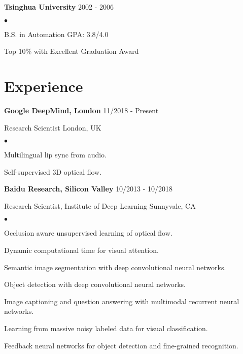 \documentclass[margin]{res3}
\newenvironment{list1}{
  \begin{list}{\ding{113}}{%
      \setlength{\itemsep}{0.03in}
      \setlength{\parsep}{0in} \setlength{\parskip}{0in}
      \setlength{\topsep}{0in} \setlength{\partopsep}{0in}
      \setlength{\leftmargin}{0in}}}{\end{list}}
\newenvironment{list2}{
  \begin{list}{$\bullet$}{%
      \setlength{\itemsep}{0.02in}
      \setlength{\parsep}{0in} \setlength{\parskip}{0in}
      \setlength{\topsep}{0in} \setlength{\partopsep}{0in}
      \setlength{\leftmargin}{0.2in}}}{\end{list}}
\begin{document}
\begin{resume}
{\bf Tsinghua University} \hfill {2002 - 2006}
\begin{list2}
\item B.S. in Automation \hfill {GPA: 3.8/4.0}
\vspace{-2pt}
\item Top 10\% with Excellent Graduation Award 
\end{list2}


\section{\sc Experience}

\begin{list1}

\item[] {\bf Google DeepMind, London} \hfill {11/2018 - Present}
\vspace{-2pt}
\item[] Research Scientist \hfill {London, UK}

\begin{list2}
\item Multilingual lip sync from audio.
\vspace{-2pt}
\item Self-supervised 3D optical flow.
\end{list2}
\vspace{5pt}


\item[] {\bf Baidu Research, Silicon Valley} \hfill {10/2013 - 10/2018}
\vspace{-2pt}
\item[] Research Scientist, Institute of Deep Learning \hfill {Sunnyvale, CA}

\begin{list2}
\item Occlusion aware unsupervised learning of optical flow.
\vspace{-2pt}
\item Dynamic computational time for visual attention.
\vspace{-2pt}
\item Semantic image segmentation with deep convolutional neural networks.
\vspace{-2pt}
\item Object detection with deep convolutional neural networks.
\vspace{-2pt}
\item Image captioning and question answering with multimodal recurrent neural networks.
\vspace{-2pt}
\item Learning from massive noisy labeled data for visual classification.
\vspace{-2pt}
\item Feedback neural networks for object detection and fine-grained recognition.
\end{list2}
\vspace{5pt}



\end{list1}
\end{resume}
\end{document}
